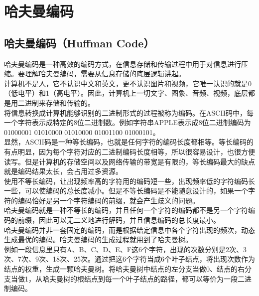 \newpage

\section{哈夫曼编码}

\subsection{哈夫曼编码（Huffman Code）}

哈夫曼编码是一种高效的编码方式，在信息存储和传输过程中用于对信息进行压缩。要理解哈夫曼编码，需要从信息存储的底层逻辑讲起。\\

计算机不是人，它不认识中文和英文，更不认识图片和视频，它唯一认识的就是0（低电平）和1（高电平）。因此，计算机上一切文字、图象、音频、视频，底层都是用二进制来存储和传输的。\\

将信息转换成计算机能够识别的二进制形式的过程被称为编码。在ASCII码中，每一个字符表示成特定的8位二进制数。例如字符串APPLE表示成8位二进制编码为01000001 01010000 01010000 01001100 01000101。\\

显然，ASCII码是一种等长编码，也就是任何字符的编码长度都相等。等长编码的有点明显，因为每个字符对应的二进制编码长度相等，所以很容易设计，也很方便读写。但是计算机的存储空间以及网络传输的带宽是有限的，等长编码最大的缺点就是编码结果太长，会占用过多资源。\\

使用不等长编码，让出现频率高的字符用的编码短一些，出现频率低的字符编码长一些，可以使编码的总长度减小。但是不等长编码是不能随意设计的，如果一个字符的编码恰好是另一个字符编码的前缀，就会产生歧义的问题。\\

哈夫曼编码就是一种不等长的编码，并且任何一个字符的编码都不是另一个字符编码的前缀，因此可以无二义地进行解码，并且信息编码的总长度最小。\\

哈夫曼编码并非一套固定的编码，而是根据给定信息中各个字符出现的频次，动态生成最优的编码。哈夫曼编码的生成过程就用到了哈夫曼树。\\

例如一段信息里只有A、B、C、D、E、F这6个字符，出现的次数分别是2次、3次、7次、9次、18次、25次。通过把这6个字符当成6个叶子结点，将出现次数作为结点的权重，生成一颗哈夫曼树。将哈夫曼树中结点的左分支当做0、结点的右分支当做1，从哈夫曼树的根结点到每一个叶子结点的路径，都可以等价为一段二进制编码。\\

